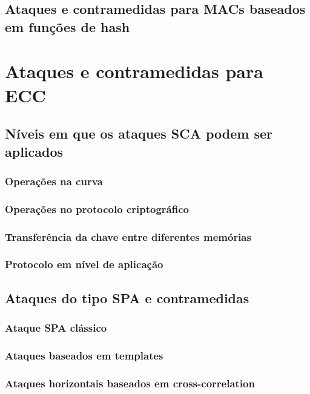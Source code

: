 \documentclass[12pt]{article}
\begin{document}
\subsection{Ataques e contramedidas para MACs baseados em funções de
hash}

\section{Ataques e contramedidas para ECC}

\subsection{Níveis em que os ataques SCA podem ser aplicados}

\subsubsection{Operações na curva}

\subsubsection{Operações no protocolo criptográfico}

\subsubsection{Transferência da chave entre diferentes memórias}

\subsubsection{Protocolo em nível de aplicação}

\subsection{Ataques do tipo SPA e contramedidas}

\subsubsection{Ataque SPA clássico}

\subsubsection{Ataques baseados em templates}

\subsubsection{Ataques horizontais baseados em cross-correlation}
\end{document}
